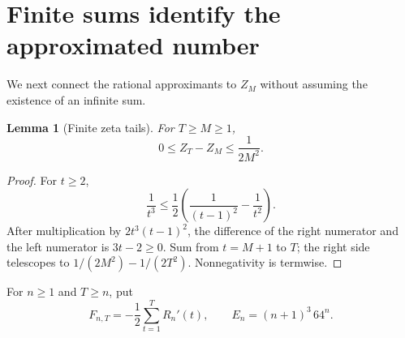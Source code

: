 \documentclass[11pt]{article}
\newtheorem{lemma}[theorem]{Lemma}
\theoremstyle{definition}\newtheorem{definition}[theorem]{Definition}
\theoremstyle{remark}\newtheorem{remark}[theorem]{Remark}
\begin{document}
\section{Finite sums identify the approximated number}\label{sec:finite}
We next connect the rational approximants to $Z_M$ without assuming the
existence of an infinite sum.

\begin{lemma}[Finite zeta tails]\label{lem:zeta-tail}
For $T\ge M\ge1$,
\begin{equation}\label{eq:zeta-tail}
 0\le Z_T-Z_M\le\frac1{2M^2}.
\end{equation}
\end{lemma}
\begin{proof}
For $t\ge2$,
\[
 \frac1{t^3}\le\frac12\left(\frac1{(t-1)^2}-\frac1{t^2}\right).
\]
After multiplication by $2t^3(t-1)^2$, the difference of the right numerator
and the left numerator is $3t-2\ge0$. Sum from $t=M+1$ to $T$; the right
side telescopes to $1/(2M^2)-1/(2T^2)$. Nonnegativity is termwise.
\end{proof}

For $n\ge1$ and $T\ge n$, put
\[
 F_{n,T}=-\frac12\sum_{t=1}^{T}R_n'(t),\qquad
 E_n=(n+1)^3\,64^n.
\]
\end{document}

